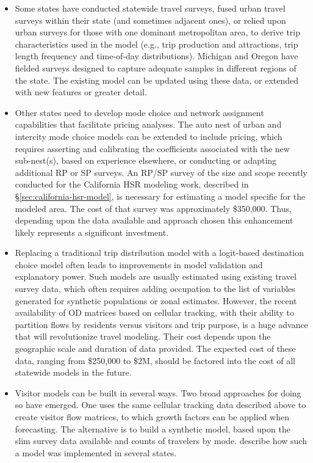 \begin{itemize}
\item
Some states have conducted statewide travel surveys, fused urban travel surveys within their state (and sometimes adjacent ones), or relied upon urban surveys for those with one dominant metropolitan area, to derive trip characteristics used in the model (e.g., trip production and attractions, trip length frequency and time-of-day distributions). Michigan and Oregon have fielded surveys designed to capture adequate samples in different regions of the state. The existing model can be updated using these data, or extended with new features or greater detail.
\item
Other states need to develop mode choice and network assignment capabilities that facilitate pricing analyses. The auto nest of urban and intercity mode choice models can be extended to include pricing, which requires asserting and calibrating the coefficients associated with the new sub-nest(s), based on experience elsewhere, or conducting or adapting additional RP or SP surveys. An RP/SP survey of the size and scope recently conducted for the California HSR modeling work, described in \S\ref{sec:california-hsr-model}, is necessary for estimating a model specific for the modeled area. The cost of that survey was approximately \$350,000. Thus, depending upon the data available and approach chosen this enhancement likely represents a significant investment.
\item
Replacing a traditional trip distribution model with a logit-based destination choice model often leads to improvements in model validation and explanatory power. Such models are usually estimated using existing travel survey data, which often requires adding occupation to the list of variables generated for synthetic populations or zonal estimates. However, the recent availability of OD matrices based on cellular tracking, with their ability to partition flows by residents versus visitors and trip purpose, is a huge advance that will revolutionize travel modeling. Their cost depends upon the geographic scale and duration of data provided. The expected cost of these data, ranging from \$250,000 to \$2M, should be factored into the cost of all statewide models in the future.
\item
Visitor models can be built in several ways. Two broad approaches for doing so have emerged. One uses the same cellular tracking data described above to create visitor flow matrices, to which growth factors can be applied when forecasting. The alternative is to build a synthetic model, based upon the slim survey data available and counts of travelers by mode. \cite{moeckel11} describe how such a model was implemented in several states.
\end{itemize}

